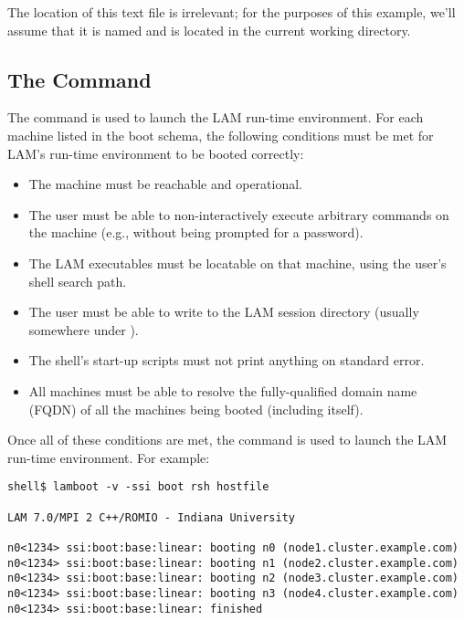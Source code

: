 The location of this text file is irrelevant; for the purposes of this
example, we'll assume that it is named  and is located
in the current working directory.


\subsection{The  Command}
\label{sec:getting-started-lamboot}

The  command is used to launch the LAM run-time
environment.  For each machine listed in the boot schema, the
following conditions must be met for LAM's run-time environment to be
booted correctly:

\begin{itemize}
\item The machine must be reachable and operational.
  
\item The user must be able to non-interactively execute arbitrary
  commands on the machine (e.g., without being prompted for a
  password).
  
\item The LAM executables must be locatable on that machine, using the
  user's shell search path.
  
\item The user must be able to write to the LAM session directory
  (usually somewhere under ).
  
\item The shell's start-up scripts must not print anything on standard
  error.
  
\item All machines must be able to resolve the fully-qualified domain
  name (FQDN) of all the machines being booted (including itself).
\end{itemize}

Once all of these conditions are met, the  command is
used to launch the LAM run-time environment.  For example:

\lstset{style=lam-cmdline}
\begin{lstlisting}
shell$ lamboot -v -ssi boot rsh hostfile

LAM 7.0/MPI 2 C++/ROMIO - Indiana University

n0<1234> ssi:boot:base:linear: booting n0 (node1.cluster.example.com)
n0<1234> ssi:boot:base:linear: booting n1 (node2.cluster.example.com)
n0<1234> ssi:boot:base:linear: booting n2 (node3.cluster.example.com)
n0<1234> ssi:boot:base:linear: booting n3 (node4.cluster.example.com)
n0<1234> ssi:boot:base:linear: finished
\end{lstlisting}

